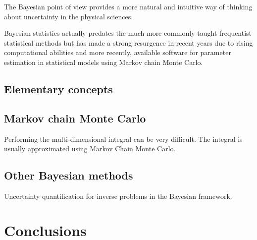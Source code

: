 The Bayesian point of view provides a more natural and intuitive way of thinking about uncertainty in the physical sciences.

Bayesian statistics actually predates the much more commonly taught frequentist statistical methods but has made a strong resurgence in recent years due to rising computational abilities and more recently, available software for parameter estimation in statistical models using Markov chain Monte Carlo.

\subsection{Elementary concepts}

\subsection{Markov chain Monte Carlo}
Performing the multi-dimensional integral can be very difficult. The integral is usually approximated using Markov Chain Monte Carlo.

\subsection{Other Bayesian methods}
Uncertainty quantification for inverse problems in the Bayesian framework.


\section{Conclusions}